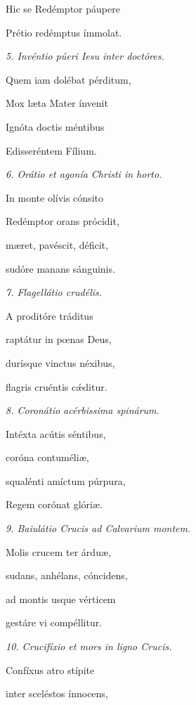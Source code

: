 \documentclass[12pt,a6paper]{book}
\begin{document}
\begin{sloppy}
Hic se Redémptor páupere

Prétio redémptus ímmolat.

\vspace{3mm}

\textit{5. Invéntio púeri Iesu inter doctóres.}

Quem iam dolébat pérditum,

Mox læta Mater ínvenit

Ignóta doctis méntibus

Edisseréntem Fílium.

\vspace{3mm}

\textit{6. Orátio et agonía Christi in horto.}

In monte olívis cónsito

Redémptor orans prócidit,

mæret, pavéscit, déficit,

sudóre manans sánguinis.

\vspace{3mm}

\textit{7. Flagellátio crudélis.}

A proditóre tráditus

raptátur in pœnas Deus,

durísque vinctus néxibus,

flagris cruéntis cǽditur.

\vspace{3mm}

\textit{8. Coronátio acérbissima spinárum.}

Intéxta acútis séntibus,

coróna contuméliæ,

squalénti amíctum púrpura,

Regem corónat glóriæ.

\vspace{3mm}

\textit{9. Baiulátio Crucis ad Calvarium montem.}

Molis crucem ter árduæ,

sudans, anhélans, cóncidens,

ad montis usque vérticem

gestáre vi compéllitur.

\vspace{3mm}

\textit{10. Crucifíxio et mors in ligno Crucis.}

Confíxus atro stípite

inter sceléstos ínnocens,


\end{sloppy}
\end{document}
